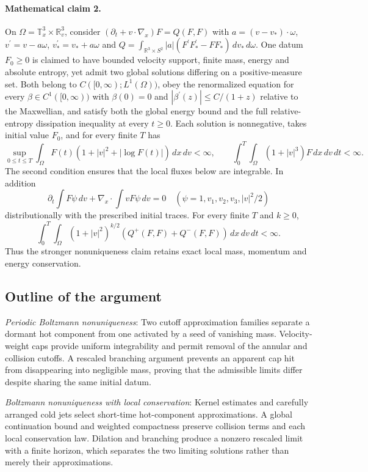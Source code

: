 \documentclass[11pt]{article}
\begin{document}
\paragraph{Mathematical claim 2.} On $\Omega=\mathbb T^3_x\times\mathbb R^3_v$, consider $(\partial_t+v\cdot\nabla_x)F=Q(F,F)$ with $a=(v-v_*)\cdot\omega$, $v^\prime=v-a\omega$, $v_*^\prime=v_*+a\omega$ and $Q=\int_{\mathbb R^3\times S^2}|a|(F^\prime F_*^\prime-FF_*)\,dv_*\,d\omega$. One datum $F_0\ge0$ is claimed to have bounded velocity support, finite mass, energy and absolute entropy, yet admit two global solutions differing on a positive-measure set. Both belong to $C([0,\infty);L^1(\Omega))$, obey the renormalized equation for every $\beta\in C^1([0,\infty))$ with $\beta(0)=0$ and $|\beta^\prime(z)|\le C/(1+z)$ relative to the Maxwellian, and satisfy both the global energy bound and the full relative-entropy dissipation inequality at every $t\ge0$. Each solution is nonnegative, takes initial value $F_0$, and for every finite $T$ has \[\sup_{0\le t\le T}\int_\Omega F(t)(1+|v|^2+|\log F(t)|)\,dx\,dv<\infty,\qquad\int_0^T\int_\Omega(1+|v|^3)F\,dx\,dv\,dt<\infty.\] The second condition ensures that the local fluxes below are integrable. In addition \[\partial_t\int F\psi\,dv+\nabla_x\cdot\int vF\psi\,dv=0\quad(\psi=1,v_1,v_2,v_3,|v|^2/2)\] distributionally with the prescribed initial traces. For every finite $T$ and $k\ge0$, \[\int_0^T\int_\Omega(1+|v|^2)^{k/2}(Q^+(F,F)+Q^-(F,F))\,dx\,dv\,dt<\infty.\] Thus the stronger nonuniqueness claim retains exact local mass, momentum and energy conservation.

\subsection{Outline of the argument}
\textit{Periodic Boltzmann nonuniqueness}: Two cutoff approximation families separate a dormant hot component from one activated by a seed of vanishing mass. Velocity-weight caps provide uniform integrability and permit removal of the annular and collision cutoffs. A rescaled branching argument prevents an apparent cap hit from disappearing into negligible mass, proving that the admissible limits differ despite sharing the same initial datum.

\textit{Boltzmann nonuniqueness with local conservation}: Kernel estimates and carefully arranged cold jets select short-time hot-component approximations. A global continuation bound and weighted compactness preserve collision terms and each local conservation law. Dilation and branching produce a nonzero rescaled limit with a finite horizon, which separates the two limiting solutions rather than merely their approximations.
\end{document}
